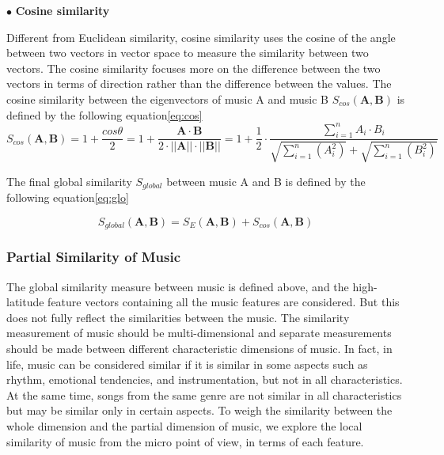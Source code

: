 \documentclass[12pt]{article}  %
\newenvironment{shrinkeq}[1]
{ \bgroup
	\addtolength\abovedisplayshortskip{#1}
	\addtolength\abovedisplayskip{#1}
	\addtolength\belowdisplayshortskip{#1}
	\addtolength\belowdisplayskip{#1}}
{\egroup\ignorespacesafterend}
\begin{document}
$\bullet$ \textbf{Cosine similarity}

Different from Euclidean similarity, cosine similarity uses the cosine of the angle between two vectors in vector space to measure the similarity between two vectors. The cosine similarity focuses more on the difference between the two vectors in terms of direction rather than the difference between the values. The cosine similarity between the eigenvectors of music A and music B $S_{cos}(\mathbf{A},\mathbf{B})$ is defined by the following equation\eqref{eq:cos}
\begin{shrinkeq}{-1.5ex}
	\begin{equation}\label{eq:cos}
	S_{cos}(\mathbf{A},\mathbf{B})=1+\frac{cos\theta}{2}=1+\frac{\mathbf{A}\cdot\mathbf{B}}{2\cdot||\mathbf{A}||\cdot||\mathbf{B}||}=1+\frac{1}{2}\cdot\frac{\sum\limits_{i=1}^{n}A_i\cdot B_i}{\sqrt{\sum\limits_{i=1}^{n}(A_i^2)}+\sqrt{\sum\limits_{i=1}^{n}(B_i^2)}}
	\end{equation}
\end{shrinkeq}

The final global similarity $S_{global}$ between music A and B is defined by the following equation\eqref{eq:glo}

\begin{shrinkeq}{-1ex}
	\begin{equation}\label{eq:glo}
	S_{global}(\mathbf{A},\mathbf{B})=S_E(\mathbf{A},\mathbf{B})+S_{cos}(\mathbf{A},\mathbf{B})
	\end{equation}
\end{shrinkeq}


\subsubsection{Partial Similarity of Music}
The global similarity measure between music is defined above, and the high-latitude feature vectors containing all the music features are considered. But this does not fully reflect the similarities between the music. The similarity measurement of music should be multi-dimensional and separate measurements should be made between different characteristic dimensions of music. In fact, in life, music can be considered similar if it is similar in some aspects such as rhythm, emotional tendencies, and instrumentation, but not in all characteristics. At the same time, songs from the same genre are not similar in all characteristics but may be similar only in certain aspects. To weigh the similarity between the whole dimension and the partial dimension of music, we explore the local similarity of music from the micro point of view, in terms of each feature. 
\end{document}

